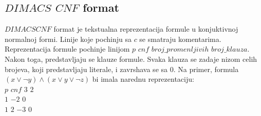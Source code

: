 \documentclass[a4paper,titlepage,12pt]{article}
\begin{document}
\subsection{$DIMACS$ $CNF$ format}

$DIMACS CNF$ format je tekstualna reprezentacija formule u kon\-juktivnoj normalnoj formi. Linije koje pochinju sa $c$ se smatraju komentarima. Reprezentacija formule pochinje linijom $p$ $cnf$ $broj\_promenljivih$ $broj\_klauza$. Nakon toga, predstavljaju se klauze formule. Svaka klauza se zadaje nizom celih brojeva, koji predstavljaju literale, i zavrshava se sa $0$. Na primer, formula $(x \vee \neg y) \wedge (x \vee y \vee \neg z)$ bi imala narednu reprezentaciju:\\

$p$ $cnf$ $3$ $2$\\
\indent $1$ $-2$ $0$\\
\indent $1$ $2$ $-3$ $0$
\end{document}
